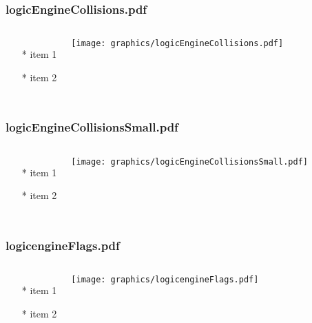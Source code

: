 \documentclass{beamer}
\begin{document}
\begin{frame} \frametitle{logicEngineCollisions.pdf}
    \begin{columns}[c]
        \begin{itemize}
            \item[*] item 1
            \item[*] item 2
        \end{itemize}
        \begin{minipage}{\linewidth}
            \begin{center}
            \texttt{[image: graphics/logicEngineCollisions.pdf]}
            \label{gfx:logicEngineCollisions.pdf}
            \end{center}
        \end{minipage}
    \end{columns}
\end{frame}
\begin{frame} \frametitle{logicEngineCollisionsSmall.pdf}
    \begin{columns}[c]
        \begin{itemize}
            \item[*] item 1
            \item[*] item 2
        \end{itemize}
        \begin{minipage}{\linewidth}
            \begin{center}
            \texttt{[image: graphics/logicEngineCollisionsSmall.pdf]}
            \label{gfx:logicEngineCollisionsSmall.pdf}
            \end{center}
        \end{minipage}
    \end{columns}
\end{frame}
\begin{frame} \frametitle{logicengineFlags.pdf}
    \begin{columns}[c]
        \begin{itemize}
            \item[*] item 1
            \item[*] item 2
        \end{itemize}
        \begin{minipage}{\linewidth}
            \begin{center}
            \texttt{[image: graphics/logicengineFlags.pdf]}
            \label{gfx:logicengineFlags.pdf}
            \end{center}
        \end{minipage}
    \end{columns}
\end{frame}
\end{document}
